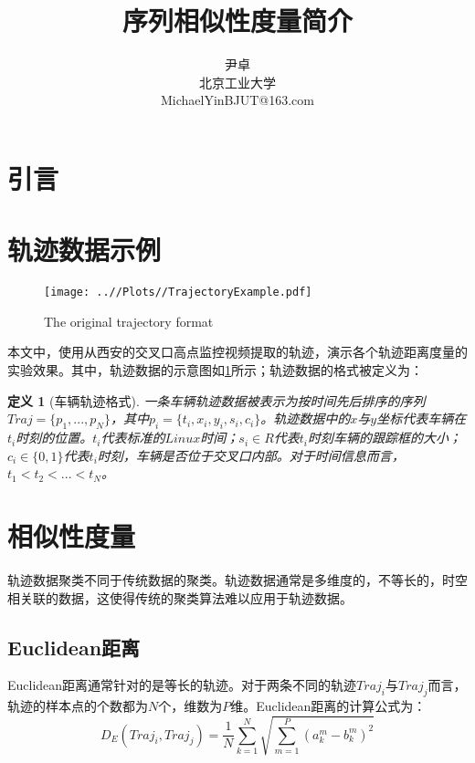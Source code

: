 \documentclass[UTF8, 12pt]{ctexart}
\newtheorem{thm}{定义}
\begin{document}
\title{\heiti 序列相似性度量简介}
\author{\kaishu 尹卓\\北京工业大学\\MichaelYinBJUT@163.com}

\maketitle

\tableofcontents
\newpage
\section{引言}
\section{轨迹数据示例}

\begin{figure}[H]
	\centering
	\texttt{[image: ..//Plots//TrajectoryExample.pdf]}
	\caption{The original trajectory format}
	\label{trajectoryExample}
	\vspace{-0.5em}
\end{figure}
本文中，使用从西安的交叉口高点监控视频提取的轨迹，演示各个轨迹距离度量的实验效果。其中，轨迹数据的示意图如\ref{trajectoryExample}所示；轨迹数据的格式被定义为：
\begin{thm}[车辆轨迹格式]
	\label{trajectoryFormat}
	一条车辆轨迹数据被表示为按时间先后排序的序列$Traj = \{p_{1}, ..., p_{N}\}$，其中$p_{i} = \{t_{i}, x_{i}, y_{i}, s_{i}, c_{i}\}$。轨迹数据中的$x$与$y$坐标代表车辆在$t_{i}$时刻的位置。$t_{i}$代表标准的$Linux$时间；$s_{i} \in R$代表$t_{i}$时刻车辆的跟踪框的大小；$c_{i} \in \{0, 1\}$代表$t_{i}$时刻，车辆是否位于交叉口内部。对于时间信息而言，$t_{1} < t_{2} < ... < t_{N}$。
\end{thm}

\section{相似性度量}
轨迹数据聚类不同于传统数据的聚类。轨迹数据通常是多维度的，不等长的，时空相关联的数据，这使得传统的聚类算法难以应用于轨迹数据。
\subsection{Euclidean距离}
Euclidean距离通常针对的是等长的轨迹。对于两条不同的轨迹$Traj_{i}$与$Traj_{j}$而言，轨迹的样本点的个数都为$N$个，维数为$P$维。Euclidean距离的计算公式为：
\begin{equation}
	D_{E}(Traj_{i}, Traj_{j}) = \frac{1}{N} \sum_{k=1}^{N} \sqrt{\sum_{m=1}^{P} (a_{k}^{m} - b_{k}^{m})^{2}}
\end{equation}
\end{document}
